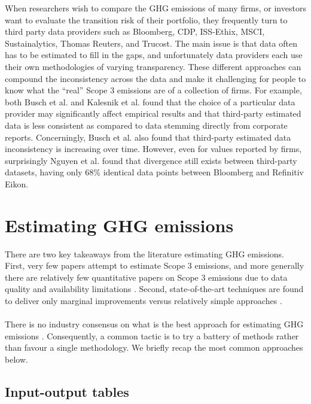 \documentclass[12pt,twoside]{report}
\begin{document}
When researchers wish to compare the GHG emissions of many firms, or investors want to evaluate the transition risk of their portfolio, they frequently turn to third party data providers such as Bloomberg, CDP, ISS-Ethix, MSCI, Sustainalytics, Thomas Reuters, and Trucost.  The main issue is that data often has to be estimated to fill in the gaps, and unfortunately data providers each use their own methodologies of varying transparency. These different approaches can compound the inconsistency across the data and make it challenging for people to know what the ``real'' Scope 3 emissions are of a collection of firms. For example, both Busch et al. \cite{Busch2022} and Kalesnik et al. \cite{KalesnikVitali2022}  found that the choice of a particular data provider may significantly affect empirical results and that third-party estimated data is less consistent as compared to data stemming directly from corporate reports. Concerningly, Busch et al. also found that third-party estimated data inconsistency is increasing over time.  However, even for values reported by firms, surprisingly Nguyen et al. \cite{Nguyenetal2023} found that divergence still exists between third-party datasets, having only 68\% identical data points between Bloomberg and Refinitiv Eikon. 

\section{Estimating GHG emissions}\label{sec:Scope3Modelling}
There are two key takeaways from the literature estimating GHG emissions. First, very few papers attempt to estimate Scope 3 emissions, and more generally there are relatively few quantitative papers on Scope 3 emissions due to data quality and availability limitations \cite{Hettler2024}. Second, state-of-the-art techniques are found to deliver only marginal improvements versus relatively simple approaches \cite{Nguyenetal2023, FTSERussell2022, olesiewicz2021}. 
\\ \\
There is no industry consensus on what is the best approach for estimating GHG emissions \cite{FTSERussell2022}. Consequently, a common tactic is to try a battery of methods rather than favour a single methodology. We briefly recap the most common approaches below.

\subsection{Input-output tables}
\end{document}
